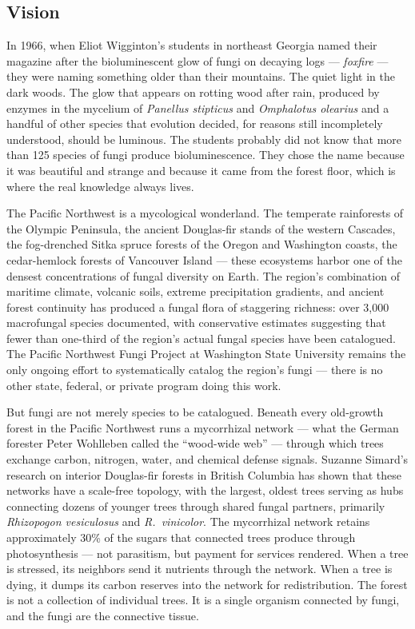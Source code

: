 \documentclass[11pt,letterpaper]{article}
\begin{document}
\subsection{Vision}

In 1966, when Eliot Wigginton's students in northeast Georgia named their magazine after the bioluminescent glow of fungi on decaying logs --- \textit{foxfire} --- they were naming something older than their mountains. The quiet light in the dark woods. The glow that appears on rotting wood after rain, produced by enzymes in the mycelium of \textit{Panellus stipticus} and \textit{Omphalotus olearius} and a handful of other species that evolution decided, for reasons still incompletely understood, should be luminous. The students probably did not know that more than 125 species of fungi produce bioluminescence. They chose the name because it was beautiful and strange and because it came from the forest floor, which is where the real knowledge always lives.

The Pacific Northwest is a mycological wonderland. The temperate rainforests of the Olympic Peninsula, the ancient Douglas-fir stands of the western Cascades, the fog-drenched Sitka spruce forests of the Oregon and Washington coasts, the cedar-hemlock forests of Vancouver Island --- these ecosystems harbor one of the densest concentrations of fungal diversity on Earth. The region's combination of maritime climate, volcanic soils, extreme precipitation gradients, and ancient forest continuity has produced a fungal flora of staggering richness: over 3,000 macrofungal species documented, with conservative estimates suggesting that fewer than one-third of the region's actual fungal species have been catalogued. The Pacific Northwest Fungi Project at Washington State University remains the only ongoing effort to systematically catalog the region's fungi --- there is no other state, federal, or private program doing this work.

But fungi are not merely species to be catalogued. Beneath every old-growth forest in the Pacific Northwest runs a mycorrhizal network --- what the German forester Peter Wohlleben called the ``wood-wide web'' --- through which trees exchange carbon, nitrogen, water, and chemical defense signals. Suzanne Simard's research on interior Douglas-fir forests in British Columbia has shown that these networks have a scale-free topology, with the largest, oldest trees serving as hubs connecting dozens of younger trees through shared fungal partners, primarily \textit{Rhizopogon vesiculosus} and \textit{R.~vinicolor}. The mycorrhizal network retains approximately 30\% of the sugars that connected trees produce through photosynthesis --- not parasitism, but payment for services rendered. When a tree is stressed, its neighbors send it nutrients through the network. When a tree is dying, it dumps its carbon reserves into the network for redistribution. The forest is not a collection of individual trees. It is a single organism connected by fungi, and the fungi are the connective tissue.
\end{document}
